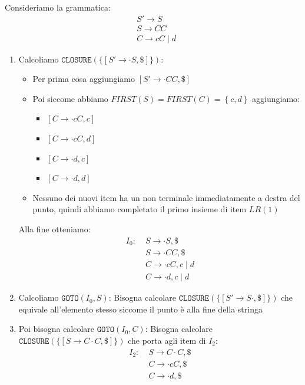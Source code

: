 \documentclass[a4paper]{article}
\begin{document}
\begin{example}\label{esempio_lr1}
  Consideriamo la grammatica:
  \[
    \begin{aligned}
    &S' \to S \\
    &S \to CC \\
    &C \to cC \mid d
    \end{aligned}
  \] 
  \begin{enumerate}
    \item Calcoliamo \( \texttt{CLOSURE}(\{ [S' \to \cdot S, \$] \}) \):
      \begin{itemize}
        \item Per prima cosa aggiungiamo \( [S' \to \cdot CC, \$] \)
        \item Poi siccome abbiamo \( FIRST(S) = FIRST(C) = \left\{ c, d \right\} \) 
          aggiungiamo:
          \begin{itemize}
            \item \( \left[ C \to \cdot cC, c \right] \) 
            \item \( \left[ C \to \cdot cC, d \right] \)
            \item \( \left[ C \to \cdot d, c \right] \) 
            \item \( \left[ C \to \cdot d, d \right] \)
          \end{itemize}
        \item Nessuno dei nuovi item ha un non terminale immediatamente a destra
          del punto, quindi abbiamo completato il primo insieme di item \( LR(1) \)
      \end{itemize}
      Alla fine otteniamo:
      \[
        \begin{aligned}
          I_0 :\; &S \to \cdot S, \$ \\
                &S \to \cdot CC, \$ \\
                &C \to \cdot cC, c \mid d \\
                &C \to \cdot d, c \mid d
        \end{aligned}
      \] 

    \item Calcoliamo \( \texttt{GOTO}(I_0, S) \):
      Bisogna calcolare \( \texttt{CLOSURE}(\{ [S' \to S \cdot, \$] \}) \)
      che equivale all'elemento stesso siccome il punto è alla fine della stringa

    \item Poi bisogna calcolare \( \texttt{GOTO}(I_0, C) \):
      Bisogna calcolare \( \texttt{CLOSURE}(\{ [S \to C \cdot C, \$] \}) \) che 
      porta agli item di \( I_2 \):
      \[
        \begin{aligned}
          I_2 :\; &S \to C \cdot C, \$ \\
                  &C \to \cdot cC, \$ \\
                  &C \to \cdot d, \$
        \end{aligned}
      \] 


\end{enumerate}
\end{example}
\end{document}
